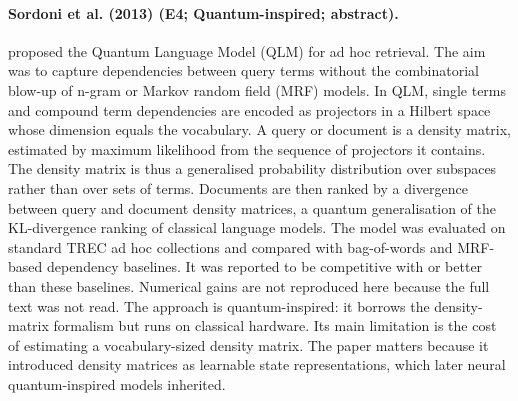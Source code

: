 \documentclass[10pt,a4paper]{article}
\begin{document}
\paragraph{Sordoni et al. (2013) (E4; Quantum-inspired; abstract).} \citet{Sordoni2013} proposed the Quantum Language Model (QLM) for ad hoc retrieval. The aim was to capture dependencies between query terms without the combinatorial blow-up of n-gram or Markov random field (MRF) models. In QLM, single terms and compound term dependencies are encoded as projectors in a Hilbert space whose dimension equals the vocabulary. A query or document is a density matrix, estimated by maximum likelihood from the sequence of projectors it contains. The density matrix is thus a generalised probability distribution over subspaces rather than over sets of terms. Documents are then ranked by a divergence between query and document density matrices, a quantum generalisation of the KL-divergence ranking of classical language models. The model was evaluated on standard TREC ad hoc collections and compared with bag-of-words and MRF-based dependency baselines. It was reported to be competitive with or better than these baselines. Numerical gains are not reproduced here because the full text was not read. The approach is quantum-inspired: it borrows the density-matrix formalism but runs on classical hardware. Its main limitation is the cost of estimating a vocabulary-sized density matrix. The paper matters because it introduced density matrices as learnable state representations, which later neural quantum-inspired models inherited.
\end{document}
